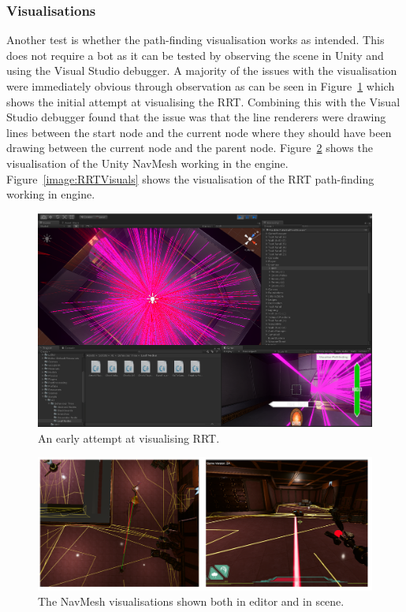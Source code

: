 \documentclass[journal]{IEEEtran}
\begin{document}
	\subsubsection{Visualisations}
	Another test is whether the path-finding visualisation works as intended. This does not require a bot as it can be tested by observing the scene in Unity and using the Visual Studio debugger. A majority of the issues with the visualisation were immediately obvious through observation as can be seen in Figure~\ref{image:initRRTVisuals} which shows the initial attempt at visualising the RRT. Combining this with the Visual Studio debugger found that the issue was that the line renderers were drawing lines between the start node and the current node where they should have been drawing between the current node and the parent node.  Figure~\ref{image:navmeshVisuals} shows the visualisation of the Unity NavMesh working in the engine.  Figure~\ref{image:RRTVisuals} shows the visualisation of the RRT path-finding working in engine.
	
	\begin{figure}[h]
		\includegraphics[width=1.0\linewidth]{IntialVisuals.PNG}
		\caption{An early attempt at visualising RRT.}
		\label{image:initRRTVisuals}
	\end{figure} 
	
	\begin{figure}[h]
		\includegraphics[width=1.0\linewidth]{NavmeshVis.png}
		\caption{The NavMesh visualisations shown both in editor and in scene.}
		\label{image:navmeshVisuals}
	\end{figure}  
	
\end{document}
